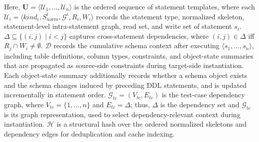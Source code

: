\documentclass[conference]{IEEEtran}
\begin{document}
Here, $\mathbf{U}=\langle \mathcal{U}_1,\ldots,\mathcal{U}_n\rangle$ is the ordered sequence of statement templates, where each $\mathcal{U}_i=\langle kind_i,S^i_{norm},\mathcal{G}^i,R_i,W_i\rangle$
records the statement type, normalized skeleton, statement-level intra-statement graph, read set, and write set of statement $s_i$.
$\Delta \subseteq \{(i,j)\mid i<j\}$ captures cross-statement dependencies, where $(i,j)\in\Delta$ iff $R_j\cap W_i\neq\emptyset$. 
$\mathcal{D}$ records the cumulative schema context after executing $\langle s_1,\ldots,s_n\rangle$, including table definitions, column types, constraints, and object-state summaries that are propagated as source-side
constraints during target-side instantiation.
Each object-state summary additionally records whether a schema object exists and the schema changes induced by preceding DDL statements, and is updated incrementally in statement order.
$\mathcal{G}_{tc}=(V_{tc},E_{tc})$ is the test-case dependency graph, where $V_{tc}=\{1,\ldots,n\}$ and $E_{tc}=\Delta$; thus, $\Delta$ is the dependency set and 
$\mathcal{G}_{tc}$ is its graph representation, used to select dependency-relevant context during instantiation.
$\mathcal{H}$ is a structural hash over the ordered normalized skeletons and dependency edges for deduplication and cache indexing.
\end{document}
